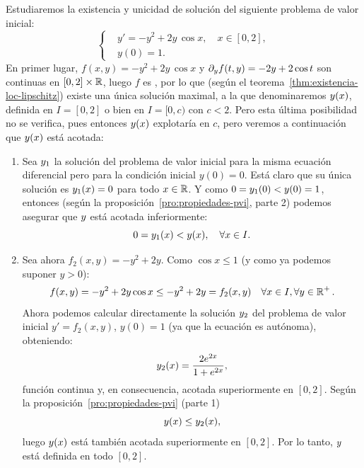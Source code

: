 \begin{example}
  \renewcommand{\tt}{x}
  \label{ex:existencia-unicidad-loc-lipschitz}
  Estudiaremos la existencia y unicidad de solución del siguiente
  problema de valor inicial: 
  \begin{equation*}
    \left\{
      \begin{aligned}
        &y' = -y^2+2y\,\cos \tt, \quad \tt\in [0,2],\\
        &y(0)=1.
      \end{aligned}
    \right.
  \end{equation*}
  En primer lugar, $f(x,y)=-y^2+2y\,\cos \tt$ y $\partial_y f(t,y)=-2y+2\cos
  t$ son continuas en $[0,2]\times\operatorname{{\mathbb R}}$, luego $f$ es \locLipschitz,
  por lo que (según el teorema~\ref{thm:existencia-loc-lipschitz})
  existe una única solución maximal, a la que denominaremos
  $\sol(\tt)$, definida en $I=[0,2]$ o bien en $I=[0,c)$ con
  $c<2$. Pero esta última posibilidad no se verifica, pues entonces
  $\sol(\tt)$ explotaría en $c$, pero veremos a continuación que
  $\sol(\tt)$ está acotada:
  \begin{enumerate}
  \item Sea $y_1$ la solución del problema de valor inicial para la
    misma ecuación diferencial pero para la condición inicial
    $y(0)=0$. Está claro que su única solución es $\sol_1(\tt)=0$
    para todo $\tt\in\Rset$. Y como $0=y_1(0)<y(0)=1$, entonces
    (según la proposición~\ref{pro:propiedades-pvi}, parte 2) podemos
    asegurar que $y$ está acotada inferiormente:
    \begin{equation*}
      0=\sol_1(\tt)<\sol(\tt), \quad \forall \tt\in I.
    \end{equation*}
  \item Sea ahora $f_2(\tt,y)=-y^2+2y$. Como $\cos\tt \le 1$  (y como
    ya podemos suponer $y>0$):
    $$f(\tt,y)=-y^2+2y\cos\tt \le -y^2+2y = f_2(\tt,y)\quad
    \forall \tt\in I, \forall y\in\Rset^+.$$ 
    Ahora podemos calcular
    directamente la solución $y_2$ del problema de valor inicial
    $y'=f_2(\tt,y)$, $y(0)=1$ (ya que la ecuación es autónoma),
    obteniendo:
    $$
    \sol_2(\tt)=\frac{2e^{2\tt}}{1+e^{2\tt}},
    $$
    función continua y, en consecuencia, acotada superiormente en $[0,2]$.
    Según la proposición~\ref{pro:propiedades-pvi} (parte 1)
    \begin{equation*}
      \sol(\tt)\le\sol_2(\tt),
    \end{equation*}
    luego $\sol(\tt)$ está también acotada superiormente en
    $[0,2]$. Por lo tanto, $y$ está definida en todo $[0,2]$.
  \end{enumerate}
  \renewcommand{\tt}{t}
\end{example}

